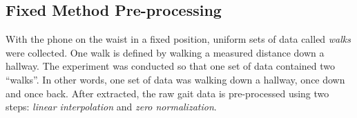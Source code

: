 \documentclass{sig-alternate}
\begin{document}
\subsection{Fixed Method Pre-processing}	
	With the phone on the waist in a fixed position, uniform sets of data called \textit{walks} were collected. One walk is defined by walking a measured distance down a hallway. The experiment was conducted so that one set of data contained two ``walks''. In other words, one set of data was walking down a hallway, once down and once back. After extracted, the raw gait data is pre-processed using two steps: \textit{linear interpolation} and \textit{zero normalization}. 
\end{document}
